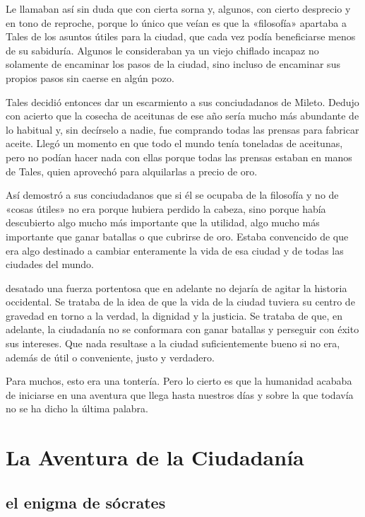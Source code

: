 \documentclass[draft,9pt,letterpaper,twocolumn,openany]{extbook}
\newcommand{\notar}[1]{\marginnote{\small\sffamily #1}[-.8em]}
\begin{document}
Le llamaban así sin duda que con cierta sorna y, algunos,
con cierto desprecio y en tono de reproche, porque lo
único que veían es que la «filosofía» apartaba a Tales de los
asuntos útiles para la ciudad, que cada vez podía
beneficiarse menos de su sabiduría. Algunos le
consideraban ya un viejo chiflado incapaz no solamente
de encaminar los pasos de la ciudad, sino incluso de
encaminar sus propios pasos sin caerse en algún pozo.

Tales decidió entonces dar un escarmiento a sus
conciudadanos de Mileto. Dedujo con acierto que la
cosecha de aceitunas de ese año sería mucho más
abundante de lo habitual y, sin decírselo a nadie, fue
comprando todas las prensas para fabricar aceite. Llegó
un momento en que todo el mundo tenía toneladas de
aceitunas, pero no podían hacer nada con ellas porque
todas las prensas estaban en manos de Tales, quien
aprovechó para alquilarlas a precio de oro. 

Así demostró a
sus conciudadanos que si él se ocupaba de la filosofía y
no de «cosas útiles» no era porque hubiera perdido la
cabeza, sino porque había descubierto algo mucho más
importante que la utilidad, algo mucho más importante
que ganar batallas o que cubrirse de oro. Estaba
convencido de que era algo destinado a cambiar
enteramente la vida de esa ciudad y de todas las
ciudades del mundo.

desatado una fuerza portentosa que en adelante no
dejaría de agitar la historia occidental. Se trataba de la idea
de que la vida de la ciudad tuviera su centro de gravedad
en torno a la verdad, la dignidad y la justicia. Se trataba de
que, en adelante, la ciudadanía no se conformara con ganar
batallas y perseguir con éxito sus intereses. Que nada
resultase a la ciudad suficientemente bueno si no era,
además de útil o conveniente, justo y verdadero.

Para muchos, esto era una tontería. Pero lo cierto es que
la humanidad acababa de iniciarse en una aventura que
llega hasta nuestros días y sobre la que todavía no se ha
dicho la última palabra.

\chapter{ La Aventura de la Ciudadanía }

\section{el enigma de sócrates}
\end{document}

